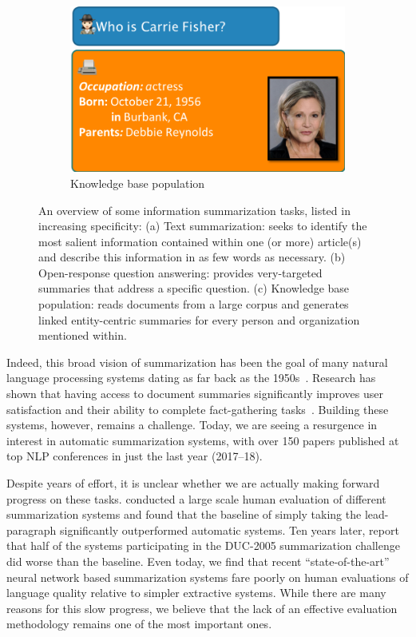 \begin{figure}[!p]
  \begin{subfigure}[b]{.42\textwidth}
    \includegraphics[width=\textwidth]{figures/task_kbp}
    \caption{Knowledge base population}
  \end{subfigure}

  \caption[Overview of some information summarization tasks]{\label{fig:intro:overview} An overview of some information summarization tasks, listed in increasing specificity:
  (a) Text summarization: seeks to identify the most salient information contained within one (or more) article(s) and describe this information in as few words as necessary.
  (b) Open-response question answering: provides very-targeted summaries that address a specific question.
  (c) Knowledge base population: reads documents from a large corpus and generates linked entity-centric summaries for every person and organization mentioned within.
  }
\end{figure}

Indeed, this broad vision of summarization has been the goal of many natural language processing systems dating as far back as the 1950s~\citep{luhn1958automatic}.
Research has shown that having access to document summaries significantly improves user satisfaction and their ability to complete fact-gathering tasks~\citep{mani1999tipster, mckeown2005summaries}. 
Building these systems, however, remains a challenge.
Today, we are seeing a resurgence in interest in automatic summarization systems, with over 150 papers published at top NLP conferences in just the last year (2017--18).

Despite years of effort, it is unclear whether we are actually making forward progress on these tasks.
\citet{brandow1995automatic} conducted a large scale human evaluation of different summarization systems and found that the baseline of simply taking the lead-paragraph significantly outperformed automatic systems. 
Ten years later, \citet{passonneau2005applying} report that half of the systems participating in the DUC-2005 summarization challenge did worse than the baseline.
Even today, we find that recent ``state-of-the-art'' neural network based summarization systems fare poorly on human evaluations of language quality relative to simpler extractive systems.
While there are many reasons for this slow progress, we believe that the lack of an effective evaluation methodology remains one of the most important ones.

